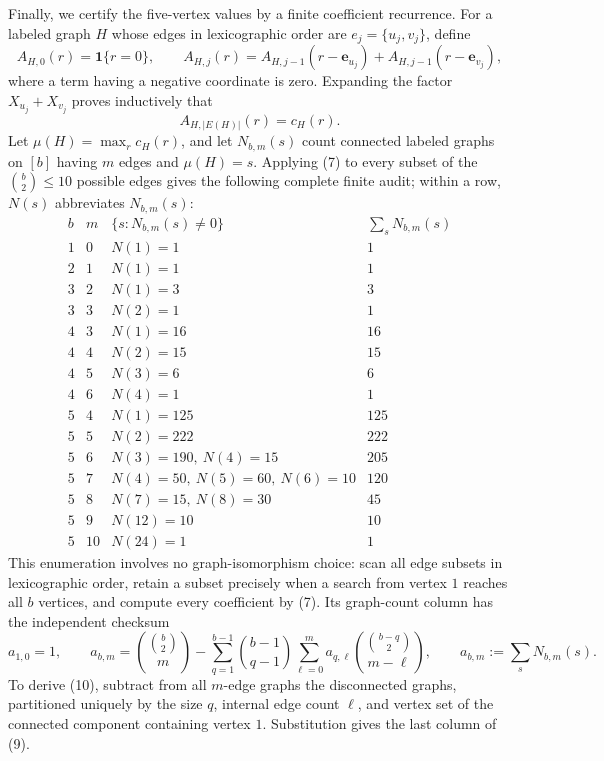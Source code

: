 Finally, we certify the five-vertex values by a finite coefficient recurrence.  For a labeled graph \(H\) whose edges in lexicographic order are \(e_j=\{u_j,v_j\}\), define
\[
 A_{H,0}(r)=\mathbf 1\{r=0\},
 \qquad
 A_{H,j}(r)=A_{H,j-1}(r-\mathbf e_{u_j})
             +A_{H,j-1}(r-\mathbf e_{v_j}),
\tag{7}
\]
where a term having a negative coordinate is zero.  Expanding the factor \(X_{u_j}+X_{v_j}\) proves inductively that
\[
 A_{H,|E(H)|}(r)=c_H(r).
\tag{8}
\]
Let \(\mu(H)=\max_r c_H(r)\), and let \(N_{b,m}(s)\) count connected labeled graphs on \([b]\) having \(m\) edges and \(\mu(H)=s\).  Applying (7) to every subset of the \(\binom b2\leq10\) possible edges gives the following complete finite audit; within a row, \(N(s)\) abbreviates \(N_{b,m}(s)\):
\[
\begin{array}{c|c|l|c}
b&m&\{s:N_{b,m}(s)\ne0\}&\sum_sN_{b,m}(s)\\ \hline
1&0&N(1)=1&1\\
2&1&N(1)=1&1\\
3&2&N(1)=3&3\\
3&3&N(2)=1&1\\
4&3&N(1)=16&16\\
4&4&N(2)=15&15\\
4&5&N(3)=6&6\\
4&6&N(4)=1&1\\
5&4&N(1)=125&125\\
5&5&N(2)=222&222\\
5&6&N(3)=190,\ N(4)=15&205\\
5&7&N(4)=50,\ N(5)=60,\ N(6)=10&120\\
5&8&N(7)=15,\ N(8)=30&45\\
5&9&N(12)=10&10\\
5&10&N(24)=1&1
\end{array}
\tag{9}
\]
This enumeration involves no graph-isomorphism choice: scan all edge subsets in lexicographic order, retain a subset precisely when a search from vertex \(1\) reaches all \(b\) vertices, and compute every coefficient by (7).  Its graph-count column has the independent checksum
\[
 a_{1,0}=1,
 \qquad
 a_{b,m}=\binom{\binom b2}{m}
 -\sum_{q=1}^{b-1}\binom{b-1}{q-1}
   \sum_{\ell=0}^{m}a_{q,\ell}
   \binom{\binom{b-q}{2}}{m-\ell},
 \qquad a_{b,m}:=\sum_sN_{b,m}(s).
\tag{10}
\]
To derive (10), subtract from all \(m\)-edge graphs the disconnected graphs, partitioned uniquely by the size \(q\), internal edge count \(\ell\), and vertex set of the connected component containing vertex \(1\).  Substitution gives the last column of (9).

